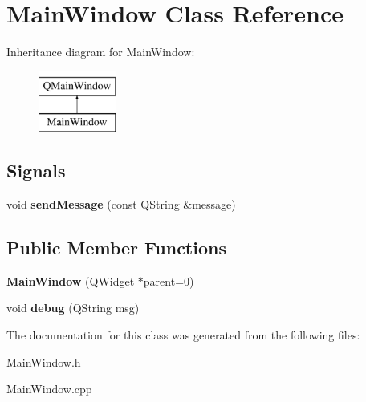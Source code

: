 \hypertarget{classMainWindow}{}\section{Main\+Window Class Reference}
\label{classMainWindow}
Inheritance diagram for Main\+Window\+:\begin{figure}[H]
\begin{center}
\leavevmode
\includegraphics[height=2.000000cm]{classMainWindow}
\end{center}
\end{figure}
\subsection*{Signals}
\begin{DoxyCompactItemize}
\item 
void {\bfseries send\+Message} (const Q\+String \&message)\hypertarget{classMainWindow_a35c45a6273f5cfff11a110bfeafdbb7f}{}\label{classMainWindow_a35c45a6273f5cfff11a110bfeafdbb7f}

\end{DoxyCompactItemize}
\subsection*{Public Member Functions}
\begin{DoxyCompactItemize}
\item 
{\bfseries Main\+Window} (Q\+Widget $\ast$parent=0)\hypertarget{classMainWindow_a8b244be8b7b7db1b08de2a2acb9409db}{}\label{classMainWindow_a8b244be8b7b7db1b08de2a2acb9409db}

\item 
void {\bfseries debug} (Q\+String msg)\hypertarget{classMainWindow_aac864c0d1dc51d589bc61ae68c6a0297}{}\label{classMainWindow_aac864c0d1dc51d589bc61ae68c6a0297}

\end{DoxyCompactItemize}


The documentation for this class was generated from the following files\+:\begin{DoxyCompactItemize}
\item 
Main\+Window.\+h\item 
Main\+Window.\+cpp\end{DoxyCompactItemize}
